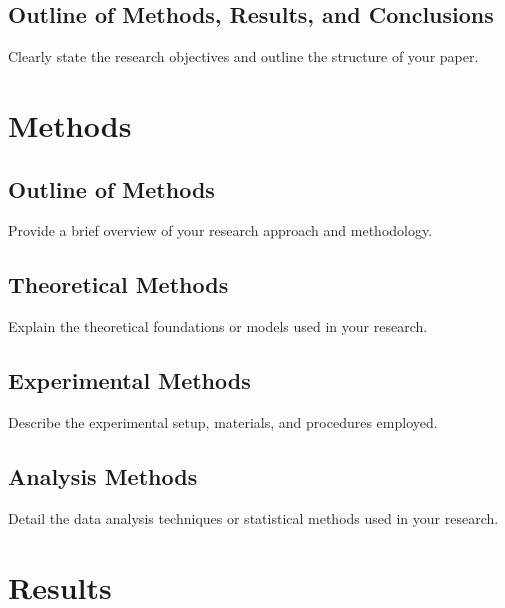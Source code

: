 \documentclass[12pt]{article}
\begin{document}
\subsection{Outline of Methods, Results, and Conclusions}
\label{subsec:intro_outline}

Clearly state the research objectives and outline the structure of your paper.

\section{Methods}
\label{sec:methods}

\subsection{Outline of Methods}
\label{subsec:methods_outline}

Provide a brief overview of your research approach and methodology.

\subsection{Theoretical Methods}
\label{subsec:theoretical}

Explain the theoretical foundations or models used in your research.

\subsection{Experimental Methods}


\label{subsec:experimental}

Describe the experimental setup, materials, and procedures employed.

\subsection{Analysis Methods}
\label{subsec:analysis}

Detail the data analysis techniques or statistical methods used in your research.

\section{Results}
\label{sec:results}
\end{document}
